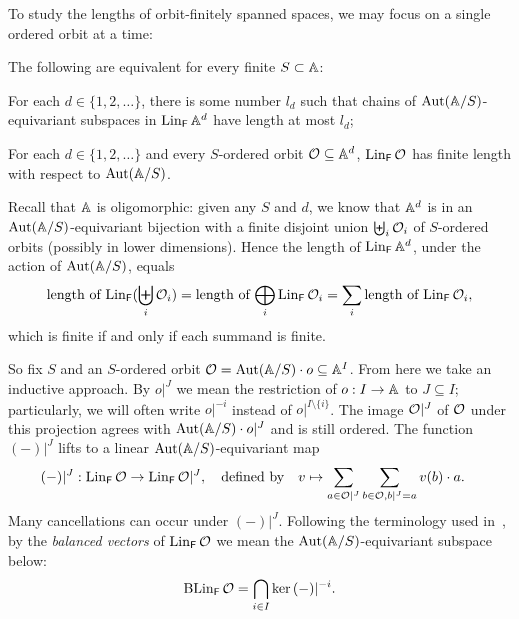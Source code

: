To study the lengths of orbit-finitely spanned spaces, we may focus on a single ordered orbit at a time:
\begin{claim}\label{claim:reduction-to-one-orbit}
    The following are equivalent for every finite $S \subset \A$:
    \begin{alphaenumerate}
        \item 
        For each $d \in \{1, 2, \dots\}$, there is some number $l_d$ such that chains of $\Aut(\A/S)$-equivariant subspaces in $\Lin_\FF \A^d$ have length at most $l_d$;
        
        \item 
        For each $d \in \{1, 2, \dots\}$ and every $S$-ordered orbit $\cal O \subseteq \A^d$,
        $\Lin_\FF \cal O$ has finite length with respect to $\Aut(\A/S)$.
    \end{alphaenumerate}
\end{claim}
\begin{claimproof}
    Recall that $\A$ is oligomorphic: given any $S$ and $d$, 
    we know that $\A^d$ is in an $\Aut(\A/S)$-equivariant bijection with a finite disjoint union $\biguplus_i \cal O_i$ of $S$-ordered orbits (possibly in lower dimensions).
    Hence the length of $\Lin_\FF \A^d$, under the action of $\Aut(\A/S)$, equals \[
        \text{length of $\Lin_\FF(\biguplus_i \cal O_i)$} = \text{length of $\bigoplus_i \Lin_\FF \cal O_i$} = \sum_i \text{length of $\Lin_\FF \cal O_i$},
    \]
    which is finite if and only if each summand is finite.
\end{claimproof}

So fix $S$ and an $S$-ordered orbit $\cal O = \Aut(\A/S) \cdot o \subseteq \A^I$.
From here we take an inductive approach.
By $o |^J$ we mean the restriction of $o : I \to \A$ to $J \subseteq I$;
particularly, we will often write $o |^{-i}$ instead of $o |^{ I \setminus \{i\} }$.
The image $\cal O|^J$ of $\cal O$ under this projection agrees with $\Aut(\A/S) \cdot o |^J$ and is still ordered.
The function $(-)|^J$ lifts to a linear $\Aut(\A/S)$-equivariant map
\begin{align*}
    (-)|^J : \Lin_\FF \cal O &\to \Lin_\FF \cal O|^J, 
    \quad \text{defined by} \quad
    v \mapsto \sum_{a \in \cal O|^J} \sum_{b \in \cal O, b|^J = a} v(b) \cdot a.
\end{align*}
Many cancellations can occur under $(-)|^J$. 
Following the terminology used in~\cite[Eq.~(4)]{BFKM24}, 
by the \emph{balanced vectors} of $\Lin_\field \cal O$ we mean the $\Aut(\A/S)$-equivariant subspace below:
\[
    \Ker_\FF \cal O = \bigcap_{i \in I} \ker{ (-)|^{-i} }.
\]

